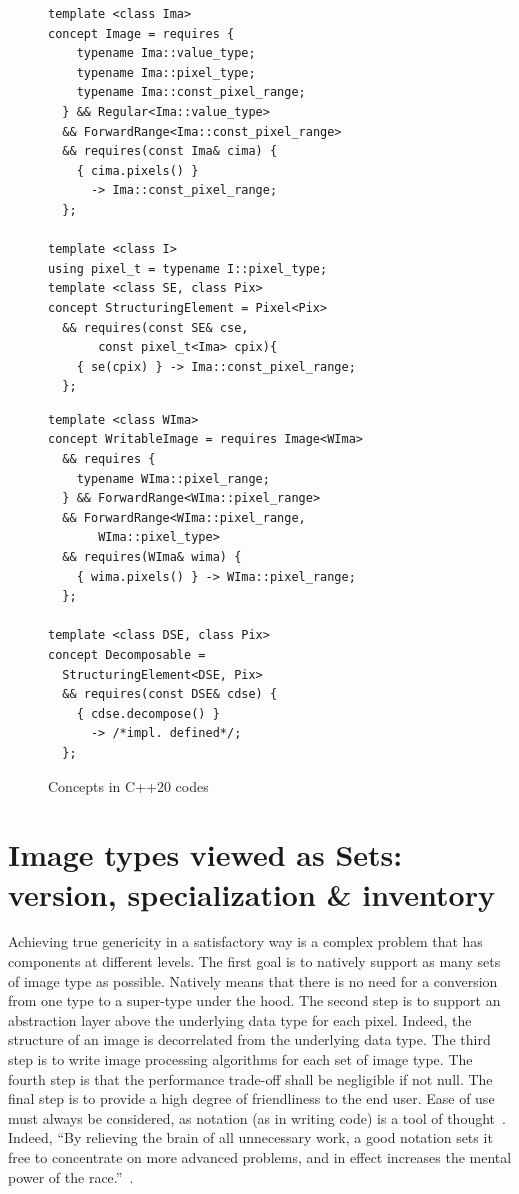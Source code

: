 \begin{figure}[htbp]

  \begin{minipage}[l]{0.48\linewidth}
    \begin{verbatim}
template <class Ima>
concept Image = requires {
    typename Ima::value_type;
    typename Ima::pixel_type;
    typename Ima::const_pixel_range;
  } && Regular<Ima::value_type>
  && ForwardRange<Ima::const_pixel_range>
  && requires(const Ima& cima) {
    { cima.pixels() }
      -> Ima::const_pixel_range;
  };

template <class I>
using pixel_t = typename I::pixel_type;
template <class SE, class Pix>
concept StructuringElement = Pixel<Pix>
  && requires(const SE& cse,
       const pixel_t<Ima> cpix){
    { se(cpix) } -> Ima::const_pixel_range;
  };
\end{verbatim}
  \end{minipage}
  \hfill
  \begin{minipage}[r]{0.48\linewidth}
    \begin{verbatim}
template <class WIma>
concept WritableImage = requires Image<WIma>
  && requires {
    typename WIma::pixel_range;
  } && ForwardRange<WIma::pixel_range>
  && ForwardRange<WIma::pixel_range,
       WIma::pixel_type>
  && requires(WIma& wima) {
    { wima.pixels() } -> WIma::pixel_range;
  };

template <class DSE, class Pix>
concept Decomposable =
  StructuringElement<DSE, Pix>
  && requires(const DSE& cdse) {
    { cdse.decompose() }
      -> /*impl. defined*/;
  };
\end{verbatim}
  \end{minipage}

  \caption{Concepts in C++20 codes}
  \label{code:concept.cpp20}
\end{figure}


\section{Image types viewed as Sets: version, specialization \& inventory}
\label{sec:image.set}

Achieving true genericity in a satisfactory way is a complex problem that has components at different levels. The first
goal is to natively support as many sets of image type as possible. Natively means that there is no need for a
conversion from one type to a super-type under the hood. The second step is to support an abstraction layer above the
underlying data type for each pixel. Indeed, the structure of an image is decorrelated from the underlying data type.
The third step is to write image processing algorithms for each set of image type. The fourth step is that the
performance trade-off shall be negligible if not null. The final step is to provide a high degree of friendliness to the
end user. Ease of use must always be considered, as notation (as in writing code) is a tool of
thought~\parencite{iverson.2007.notation}. Indeed, ``By relieving the brain of all unnecessary work, a good notation
sets it free to concentrate on more advanced problems, and in effect increases the mental power of the
race.''~\parencite{cajori.1993.history}.

